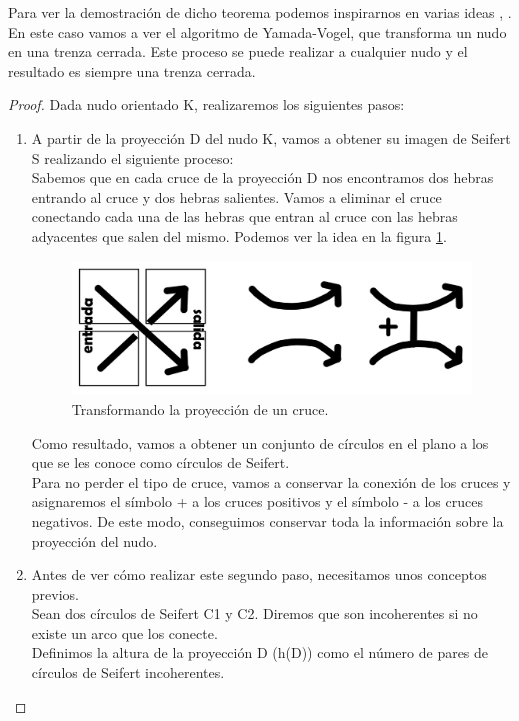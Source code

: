 Para ver la demostración de dicho teorema podemos inspirarnos en varias ideas \cite{13}, \cite{14}. En este caso vamos a ver el algoritmo de Yamada-Vogel, que transforma un nudo en una trenza cerrada. Este proceso se puede realizar a cualquier nudo y el resultado es siempre una trenza cerrada. 
\begin{proof}
	Dada nudo orientado K, realizaremos los siguientes pasos:
	\begin{enumerate}
		\item A partir de la proyección D del nudo K, vamos a obtener su imagen de Seifert S realizando el siguiente proceso:\\
		Sabemos que en cada cruce de la proyección D nos encontramos dos hebras entrando al cruce y dos hebras salientes. Vamos a eliminar el cruce conectando cada una de las hebras que entran al cruce con las hebras adyacentes que salen del mismo. Podemos ver la idea en la figura \ref{prueale1}.\\
		
		\begin{figure}[h!]
			\centering
			\includegraphics[width=12cm]{inudos/ima8.png}
			\caption{Transformando la proyección de un cruce.}
			\label{prueale1} 
		\end{figure}
		
		
		Como resultado, vamos a obtener un conjunto de círculos en el plano a los que se les conoce como círculos de Seifert. \\
		Para no perder el tipo de cruce, vamos a conservar la conexión de los cruces y asignaremos el símbolo + a los cruces positivos y el símbolo - a los cruces negativos. De este modo, conseguimos conservar toda la información sobre la proyección del nudo. 
		
		\item Antes de ver cómo realizar este segundo paso, necesitamos unos conceptos previos. \\
	
		Sean dos círculos de Seifert C1 y C2. Diremos que son incoherentes si no existe un arco que los conecte.\\
		Definimos la altura de la proyección D (h(D)) como el número de pares de círculos de Seifert incoherentes.\\
		

\end{enumerate}
\end{proof}
